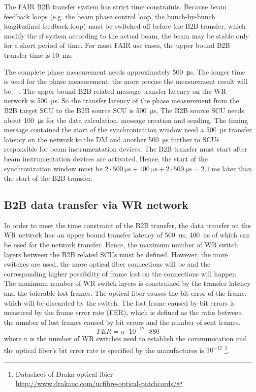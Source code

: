 The FAIR B2B transfer system has strict time constraints. Because beam feedback loops (e.g. the beam phase control
loop, the bunch-by-bunch longitudinal feedback loop) must be switched off before the B2B transfer, which modify the rf system according to the actual beam, the beam may be stable only for a short period of time. For most FAIR use cases, the upper bound B2B transfer time is \SI{10}{\ms}. 

The complete phase measurement needs approximately \SI{500}{\us}. The longer time is used for the phase measurement, the
more precise the measurement result will be. ~\cite{ferrand_development_nodata}. The upper bound B2B related message transfer latency  on the WR network is \SI{500}{\us}. So the transfer latency of the phase measurement from the B2B target SCU to the B2B source SCU is \SI{500}{\us}. The B2B source SCU needs about \SI{100}{\us} for the data calculation, message creation and sending. The timing message contained the start of the synchronization window need a \SI{500}{\us} transfer latency on the network to the DM and another \SI{500}{\us} further to SCUs responsible for beam instrumentation devices. The B2B transfer must start after beam instrumentation devices are activated. Hence, the start of the synchronization window must be $2 \cdot \SI{500}{\us} + \SI{100}{\us} + 2\cdot\SI{500}{\us} = \SI{2.1}{\ms}$ later than the start of the B2B transfer. 

\subsection{B2B data transfer via WR network}
In order to meet the time constraint of the B2B transfer, the data transfer on the WR network has an upper bound transfer latency of \SI{500}{us}, \SI{400}{us} of which can be used for the network transfer. Hence, the maximum number of WR switch layers between the B2B related SCUs must be defined. However, the more switches are used, the more optical fiber connections will be and the corresponding higher possibility of frame lost on the connections will happen. The maximum number of WR switch layers is constrained by the transfer latency and the tolerable lost frames. The optical fiber causes the bit error of the frame, which will be discarded by the switch. The lost frame caused by bit errors is measured by the frame error rate (FER), which is defined as the ratio between the number of lost frames caused by bit errors and the number of sent frames. 
\begin{equation}
\label{FER}
	FER=n\cdot10^{-12}\cdot880
\end{equation}
where n is the number of WR switches used to establish the communication and the optical fiber's bit error rate is specified by the manufactures is $10^{-12}$ \footnote{Datasheet of Draka optical fbier \\ \url{http://www.drakauc.com/ucfibre-optical-patchcords/}}.  

